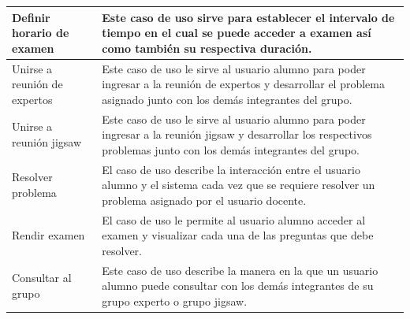 \begin{longtable}{|L{4cm}|L{9cm}|}
	\hline
	Definir horario de examen & Este caso de uso sirve para establecer el intervalo de tiempo en el cual se puede acceder a examen así como también su respectiva duración.\\
	\hline
	Unirse a reunión de expertos & Este caso de uso le sirve al usuario alumno para poder ingresar a la reunión de expertos y desarrollar el problema asignado junto con los demás integrantes del grupo.\\
	\hline
	Unirse a reunión jigsaw & Este caso de uso le sirve al usuario alumno para poder ingresar a la reunión jigsaw y desarrollar los respectivos problemas junto con los demás integrantes del grupo. \\
	\hline
	Resolver problema & El caso de uso describe la interacción entre el usuario alumno y el sistema cada vez que se requiere resolver un problema asignado por el usuario docente.\\
	\hline
	Rendir examen & El caso de uso le permite al usuario alumno acceder al examen y visualizar cada una de las preguntas que debe resolver.\\
	\hline
	Consultar al grupo & Este caso de uso describe la manera en la que un usuario alumno puede consultar con los demás integrantes de su grupo experto o grupo jigsaw.\\
	\hline
\end{longtable}

\clearpage
